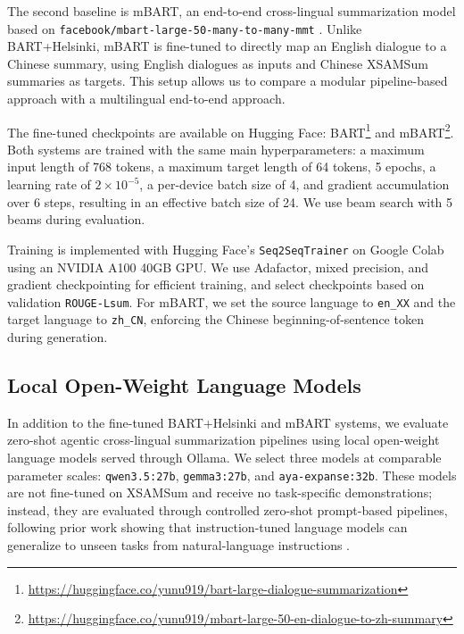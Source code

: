 \documentclass[11pt]{article}
\begin{document}
The second baseline is mBART, an end-to-end cross-lingual summarization model
based on \texttt{facebook/mbart-large-50-many-to-many-mmt}
\citep{liu2020multilingual,tang-etal-2021-multilingual}. Unlike BART+Helsinki, mBART is fine-tuned to
directly map an English dialogue to a Chinese summary, using English dialogues as
inputs and Chinese XSAMSum summaries as targets. This setup allows us to compare
a modular pipeline-based approach with a multilingual end-to-end approach.

The fine-tuned checkpoints are available on Hugging Face:
BART\footnote{\url{https://huggingface.co/yunu919/bart-large-dialogue-summarization}}
and mBART\footnote{\url{https://huggingface.co/yunu919/mbart-large-50-en-dialogue-to-zh-summary}}.
Both systems are trained with the same main hyperparameters: a maximum input
length of 768 tokens, a maximum target length of 64 tokens, 5 epochs, a learning
rate of $2\times10^{-5}$, a per-device batch size of 4, and gradient accumulation
over 6 steps, resulting in an effective batch size of 24. We use beam search with
5 beams during evaluation.

Training is implemented with Hugging Face's \texttt{Seq2SeqTrainer} on Google
Colab using an NVIDIA A100 40GB GPU. We use Adafactor, mixed precision, and
gradient checkpointing for efficient training, and select checkpoints based on
validation \texttt{ROUGE-Lsum}. For mBART, we set the source language to
\texttt{en\_XX} and the target language to \texttt{zh\_CN}, enforcing the Chinese
beginning-of-sentence token during generation.

\subsection{Local Open-Weight Language Models}

In addition to the fine-tuned BART+Helsinki and mBART systems, we evaluate
zero-shot agentic cross-lingual summarization pipelines using local open-weight
language models served through Ollama. We select three models at comparable
parameter scales: \texttt{qwen3.5:27b}, \texttt{gemma3:27b}, and
\texttt{aya-expanse:32b}. These models are not fine-tuned on XSAMSum and receive
no task-specific demonstrations; instead, they are evaluated through controlled
zero-shot prompt-based pipelines, following prior work showing that
instruction-tuned language models can generalize to unseen tasks from
natural-language instructions \citep{wei-etal-2022-finetuned,chung-etal-2024-scaling}.
\end{document}
